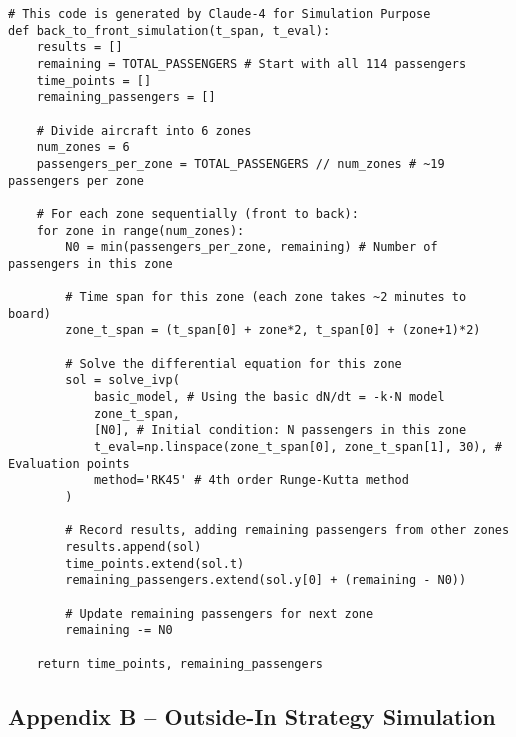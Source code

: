 \documentclass[12pt]{article}
\begin{document}
\begin{verbatim}
# This code is generated by Claude-4 for Simulation Purpose
def back_to_front_simulation(t_span, t_eval):
    results = []
    remaining = TOTAL_PASSENGERS # Start with all 114 passengers
    time_points = []
    remaining_passengers = []
    
    # Divide aircraft into 6 zones
    num_zones = 6
    passengers_per_zone = TOTAL_PASSENGERS // num_zones # ~19 passengers per zone
    
    # For each zone sequentially (front to back):
    for zone in range(num_zones):
        N0 = min(passengers_per_zone, remaining) # Number of passengers in this zone
        
        # Time span for this zone (each zone takes ~2 minutes to board)
        zone_t_span = (t_span[0] + zone*2, t_span[0] + (zone+1)*2)
        
        # Solve the differential equation for this zone
        sol = solve_ivp(
            basic_model, # Using the basic dN/dt = -k·N model
            zone_t_span,
            [N0], # Initial condition: N passengers in this zone
            t_eval=np.linspace(zone_t_span[0], zone_t_span[1], 30), # Evaluation points
            method='RK45' # 4th order Runge-Kutta method
        )
        
        # Record results, adding remaining passengers from other zones
        results.append(sol)
        time_points.extend(sol.t)
        remaining_passengers.extend(sol.y[0] + (remaining - N0))
        
        # Update remaining passengers for next zone
        remaining -= N0
    
    return time_points, remaining_passengers
\end{verbatim}

\subsection{Appendix B – Outside-In Strategy Simulation}
\end{document}
